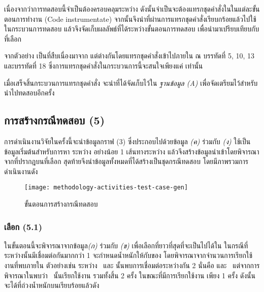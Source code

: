 เนื่องจากว่าการทดสอบนี้จำเป็นต้องครอบคลุม{\Path}ระหว่าง{\CUT} ดังนั้นจำเป็นจะต้องแทรกชุดคำสั่งใน{\sourcecode}ในแต่ละขั้นตอนการทำงาน 
(Code instrumentate) จากนั้นจึงนำ{\sourcecode}ที่ผ่านการแทรกชุดคำสั่งเรียบกร้อยแล้วไปใช้ในกระบวนการทดสอบ 
แล้วจึงจัดเก็บผลลัพธ์ที่ได้ระหว่างขั้นตอนการทดสอบ เพื่อนำมาเปรียบเทียบกับ{\TestPath}ที่เลือก

\begin{figure}[hbt!]
    \lstset{basicstyle=\tiny,style=thesiscodestyle}
    
    \caption{{\class} }
    \label{fig:javaBonusScoreInstrumented}
\end{figure}

จากตัวอย่าง เป็น{\sourcecode}ที่สืบเนื่องมาจาก
แต่ต่างกันโดยแทรกชุดคำสั่งเข้าไปภายใน{\sourcecode} ณ บรรทัดที่ 5, 10, 13 และบรรทัดที่ 18 ซึ่งการแทรกชุดคำสั่งในกระบวนการนี้จะสนใจเพียงแค่{\CUT} เท่านั้น

เมื่อเสร็จสิ้นกระบวนการแทรกชุดคำสั่ง จะนำ{\sourcecode}ที่ได้จัดเก็บไว้ใน {\it ฐานข้อมูล (A)} เพื่อจัดเตรียมไว้สำหรับนำไปทดสอบอีกครั้ง

\clearpage
\subsection{การสร้างกรณีทดสอบ (5)}

การดำเนินงานวิจัยในครั้งนี้จะนำข้อมูลกราฟ (3) ซึ่งประกอบไปด้วยข้อมูล {\it {\scg} (ค)} ร่วมกับ{\it {\cfg} (ง)} ใช้เป็นข้อมูลเริ่มต้นสำหรับการหา{\TestPath}
ระหว่าง{\CUT} อย่างน้อย 1 เส้นทางระหว่าง{\class} แล้วจึงสร้างข้อมูลนำเข้าโดยพิจารณาจาก{\PredicateNode}ที่ปรากฎบน{\TestPath}ที่เลือก 
สุดท้ายจีงนำข้อมูลทั้งหมดที่ได้สร้างเป็นชุดกรณีทดสอบ โดยมีภาพรวมการดำเนินงานดัง {}

\begin{figure}[ht!]
    \centering
    \texttt{[image: methodology-activities-test-case-gen]}
    \caption{ขั้นตอนการสร้างกรณีทดสอบ}
    \label{fig:testcaseGenerationActivity}
\end{figure}

\subsubsection{เลือก{\TestPath} (5.1)}

ในขั้นตอนนี้จะพิจารณาจากข้อมูล{\it \scg (ก)} ร่วมกับ {\it \cfg (ข)} เพื่อเลือก{\TestPath}ที่ยาวที่สุดที่จะเป็นไปได้ใน{\scg} 
ในกรณีที่ระหว่าง{\CUT}นั้นมี{\Path}เชื่อมต่อกันมากกว่า 1 {\Path} จะกำหนดน้ำหนักให้กับ{\Edge}ของ{\scg} โดยพิจารณาจากจำนวนการเรียกใช้งานที่พบภายใน{\cfg} 
ตัวอย่างเช่น ระหว่าง\class\  และ นั้นพบการเชื่อมต่อระหว่างกัน 2 {\method} นั่นคือ
 และ\  แต่จากการพิจารณาใน{\sourcecode}พบว่า{\class}\  นั้นเรียกใช้งาน\method
{} รวมทั้งสิ้น 2 ครั้ง ในขณะที่มีการเรียกใช้งาน  เพียง 1 ครั้ง ดังนั้นจะได้{\scg}ที่ถ่วงน้ำหนักบน{\Edge}เรียบร้อยแล้วดัง 

